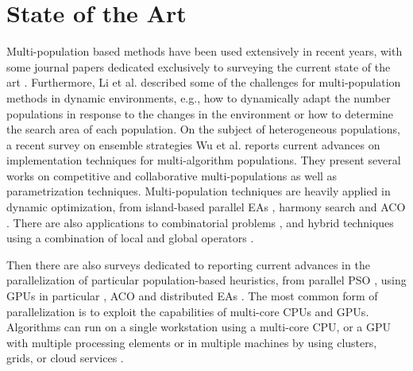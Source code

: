 \documentclass[runningheads]{llncs}
\begin{document}
\section{State of the Art}

Multi-population based methods have been used extensively in recent years, with
some journal papers dedicated exclusively to surveying the current state of the
art \cite{ma2019multi}. Furthermore,  Li et al. \cite{li2015multi} described
some of the challenges for multi-population methods in dynamic environments,
e.g., how to dynamically adapt the number populations in response to the changes
in the environment or how to determine the search area of each population. On
the subject of heterogeneous populations, a recent survey on ensemble strategies
Wu et al. \cite{wu2019ensemble} reports current advances on implementation
techniques for multi-algorithm populations. They present several works on
competitive and collaborative multi-populations as well as parametrization
techniques. Multi-population techniques are heavily applied in dynamic optimization, from
island-based parallel EAs \cite{lissovoi2017runtime}, harmony search
\cite{turky2014multi} and ACO \cite{nseef2016adaptive}. There are also 
applications to combinatorial problems \cite{pourvaziri2014hybrid}, 
and hybrid techniques using a combination of local and global operators
\cite{bai2018integrated}.

Then there are also surveys dedicated to reporting current advances in the
parallelization of particular population-based heuristics, from parallel PSO
\cite{Lalwani2019}, using GPUs in particular \cite{tan2015survey}, ACO
\cite{pedemonte2011survey} and distributed EAs \cite{gong2015distributed}.  
The most common form of parallelization is to exploit the capabilities of
multi-core CPUs and GPUs. Algorithms can run on a single workstation using a
multi-core CPU, or a GPU with multiple processing elements or in multiple
machines by using clusters, grids, or cloud services \cite{Lalwani2019}.
\end{document}
